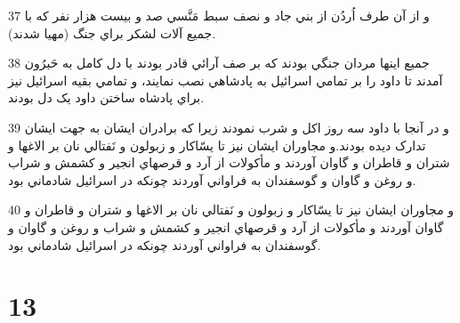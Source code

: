 \par 37 و از آن طرف اُردُن از بني جاد و نصف سبط مَنَّسي صد و بيست هزار نفر که با جميع آلات لشکر براي جنگ (مهيا شدند).
\par 38 جميع اينها مردان جنگي بودند که بر صف آرائي قادر بودند با دل کامل به حَبرُون آمدند تا داود را بر تمامي اسرائيل به پادشاهي نصب نمايند، و تمامي بقيه اسرائيل نيز براي پادشاه ساختن داود يک دل بودند.
\par 39 و در آنجا با داود سه روز اکل و شرب نمودند زيرا که برادران ايشان به جهت ايشان تدارک ديده بودند.و مجاوران ايشان نيز تا يسّاکار و زبولون و نَفتالي نان بر الاغها و شتران و قاطران و گاوان آوردند و مأکولات از آرد و قرصهاي انجير و کشمش و شراب و روغن و گاوان و گوسفندان به فراواني آوردند چونکه در اسرائيل شادماني بود.
\par 40 و مجاوران ايشان نيز تا يسّاکار و زبولون و نَفتالي نان بر الاغها و شتران و قاطران و گاوان آوردند و مأکولات از آرد و قرصهاي انجير و کشمش و شراب و روغن و گاوان و گوسفندان به فراواني آوردند چونکه در اسرائيل شادماني بود.
 
\chapter{13}

